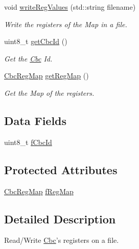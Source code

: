 \begin{DoxyCompactItemize}
void \hyperlink{class_ph2___hw_description_1_1_cbc_a21a95937ae871d154b4d0f7f2fe6bd02}{write\-Reg\-Values} (std\-::string filename)
\begin{DoxyCompactList}\small\item\em Write the registers of the Map in a file. \end{DoxyCompactList}\item 
uint8\-\_\-t \hyperlink{class_ph2___hw_description_1_1_cbc_a14a78f27fb0e6c74622b6bc49259a2f3}{get\-Cbc\-Id} ()
\begin{DoxyCompactList}\small\item\em Get the \hyperlink{class_ph2___hw_description_1_1_cbc}{Cbc} Id. \end{DoxyCompactList}\item 
\hyperlink{namespace_ph2___hw_description_a9a23b373068f169aa67ca1d22c9a6001}{Cbc\-Reg\-Map} \hyperlink{class_ph2___hw_description_1_1_cbc_ad2bae647b2474b4737d7f2ede5a73ed3}{get\-Reg\-Map} ()
\begin{DoxyCompactList}\small\item\em Get the Map of the registers. \end{DoxyCompactList}\end{DoxyCompactItemize}
\subsection*{Data Fields}
\begin{DoxyCompactItemize}
\item 
uint8\-\_\-t \hyperlink{class_ph2___hw_description_1_1_cbc_a99b392306d4cdb7ffa7f956fc553011c}{f\-Cbc\-Id}
\end{DoxyCompactItemize}
\subsection*{Protected Attributes}
\begin{DoxyCompactItemize}
\item 
\hyperlink{namespace_ph2___hw_description_a9a23b373068f169aa67ca1d22c9a6001}{Cbc\-Reg\-Map} \hyperlink{class_ph2___hw_description_1_1_cbc_ab4dbf1af172e821d95f77acb7e4fb962}{f\-Reg\-Map}
\end{DoxyCompactItemize}


\subsection{Detailed Description}
Read/\-Write \hyperlink{class_ph2___hw_description_1_1_cbc}{Cbc}'s registers on a file. 

